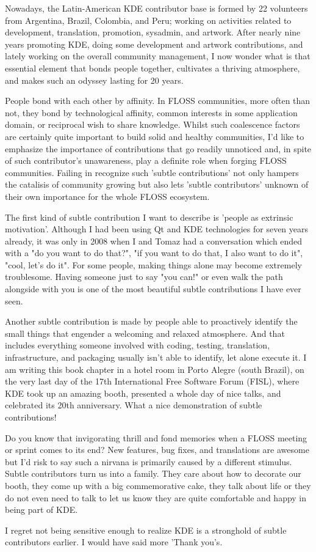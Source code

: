 Nowadays, the Latin-American KDE contributor base is formed by 22 volunteers from Argentina, Brazil, Colombia, and Peru; working on activities related to development, translation, promotion, sysadmin, and artwork. After nearly nine years promoting KDE, doing some development and artwork contributions, and lately working on the overall community management, I now wonder what is that essential element that bonds people together, cultivates a thriving atmosphere, and makes such an odyssey lasting for 20 years.

People bond with each other by affinity. In FLOSS communities, more often than not, they bond by technological affinity, common interests in some application domain, or reciprocal wish to share knowledge. Whilst such coalescence factors are certainly quite important to build solid and healthy communities, I'd like to emphasize the importance of contributions that go readily unnoticed and, in spite of such contributor's unawareness, play a definite role when forging FLOSS communities. Failing in recognize such 'subtle contributions' not only hampers the catalisis of community growing but also lets 'subtle contributors' unknown of their own importance for the whole FLOSS ecosystem.

The first kind of subtle contribution I want to describe is 'people as extrinsic motivation'. Although I had been using Qt and KDE technologies for seven years already, it was only in 2008 when I and Tomaz had a conversation which ended with a "do you want to do that?", "if you want to do that, I also want to do it", "cool, let's do it". For some people, making things alone may become extremely troublesome. Having someone just to say "you can!" or even walk the path alongside with you is one of the most beautiful subtle contributions I have ever seen.

Another subtle contribution is made by people able to proactively identify the small things that engender a welcoming and relaxed atmosphere. And that includes everything someone involved with coding, testing, translation, infrastructure, and packaging usually isn't able to identify, let alone execute it. I am writing this book chapter in a hotel room in Porto Alegre (south Brazil), on the very last day of the 17th International Free Software Forum (FISL), where KDE took up an amazing booth, presented a whole day of nice talks, and celebrated its 20th anniversary. What a nice demonstration of subtle contributions!

Do you know that invigorating thrill and fond memories when a FLOSS meeting or sprint comes to its end? New features, bug fixes, and translations are awesome but I'd risk to say such a nirvana is primarily caused by a different stimulus. Subtle contributors turn us into a family. They care about how to decorate our booth, they come up with a big commemorative cake, they talk about life or they do not even need to talk to let us know they are quite comfortable and happy in being part of KDE.

I regret not being sensitive enough to realize KDE is a stronghold of subtle contributors earlier. I would have said more 'Thank you's.
